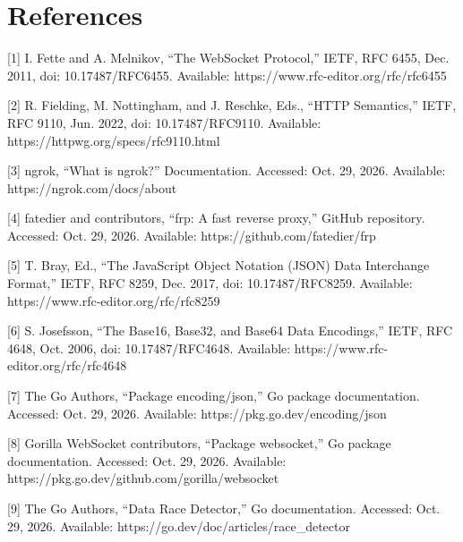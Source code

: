 \documentclass[conference]{IEEEtran}
\begin{document}
\section*{References}

[1] I. Fette and A. Melnikov, ``The WebSocket Protocol,'' IETF, RFC 6455, Dec. 2011, doi: 10.17487/RFC6455. Available: https://www.rfc-editor.org/rfc/rfc6455

[2] R. Fielding, M. Nottingham, and J. Reschke, Eds., ``HTTP Semantics,'' IETF, RFC 9110, Jun. 2022, doi: 10.17487/RFC9110. Available: https://httpwg.org/specs/rfc9110.html

[3] ngrok, ``What is ngrok?'' Documentation. Accessed: Oct. 29, 2026. Available: https://ngrok.com/docs/about

[4] fatedier and contributors, ``frp: A fast reverse proxy,'' GitHub repository. Accessed: Oct. 29, 2026. Available: https://github.com/fatedier/frp

[5] T. Bray, Ed., ``The JavaScript Object Notation (JSON) Data Interchange Format,'' IETF, RFC 8259, Dec. 2017, doi: 10.17487/RFC8259. Available: https://www.rfc-editor.org/rfc/rfc8259

[6] S. Josefsson, ``The Base16, Base32, and Base64 Data Encodings,'' IETF, RFC 4648, Oct. 2006, doi: 10.17487/RFC4648. Available: https://www.rfc-editor.org/rfc/rfc4648

[7] The Go Authors, ``Package encoding/json,'' Go package documentation. Accessed: Oct. 29, 2026. Available: https://pkg.go.dev/encoding/json

[8] Gorilla WebSocket contributors, ``Package websocket,'' Go package documentation. Accessed: Oct. 29, 2026. Available: https://pkg.go.dev/github.com/gorilla/websocket

[9] The Go Authors, ``Data Race Detector,'' Go documentation. Accessed: Oct. 29, 2026. Available: https://go.dev/doc/articles/race\_detector
\end{document}
